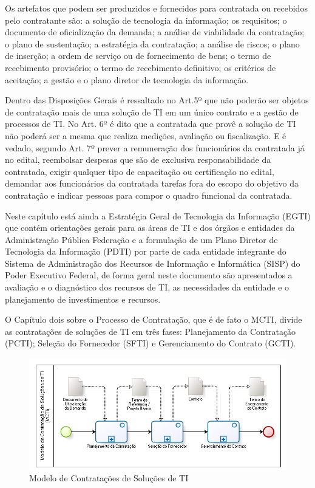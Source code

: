 Os artefatos que podem ser produzidos e fornecidos para contratada ou recebidos pelo contratante são: a solução de tecnologia da informação; os requisitos; o documento de oficialização da demanda; a análise de viabilidade da contratação; o plano de sustentação; a estratégia da contratação; a análise de riscos; o plano de inserção; a ordem de serviço ou de fornecimento de bens; o termo de recebimento provisório; o termo de recebimento definitivo; os critérios de aceitação; a gestão e o plano diretor de tecnologia da informação.

Dentro das Disposições Gerais é ressaltado no Art.5º que não poderão ser objetos de contratação mais de uma solução de TI em um único contrato e a gestão de processos de TI.  No Art. 6º é dito que a contratada que provê a solução de TI não poderá ser a mesma que realiza medições, avaliação ou fiscalização. E é vedado, segundo Art. 7º prever a remuneração dos funcionários da contratada já no edital, reembolsar despesas que são de exclusiva responsabilidade da contratada, exigir qualquer tipo de capacitação ou certificação no edital, demandar aos funcionários da contratada tarefas fora do escopo do objetivo da contratação  e indicar pessoas para compor o quadro funcional da contratada. 

Neste capítulo está ainda a Estratégia Geral de Tecnologia da Informação (EGTI) que contém orientações gerais para as áreas de TI e dos órgãos e entidades da Administração Pública Federação e a formulação de um Plano Diretor de Tecnologia da Informação (PDTI) por parte de cada entidade integrante do Sistema de Administração dos Recursos de Informação e Informática (SISP) do Poder Executivo Federal, de forma geral neste documento são apresentados a avaliação e o diagnóstico dos recursos de TI, as necessidades da entidade e o planejamento de investimentos e recursos.

O Capítulo dois sobre o Processo de Contratação, que é de fato o MCTI, divide as contratações de soluções de TI em três fases: Planejamento da Contratação (PCTI); Seleção do Fornecedor (SFTI) e Gerenciamento do Contrato (GCTI).

\begin{figure}[h]
		\centering
		\label{fig05}
			\includegraphics[scale=0.8]{figuras/MCTI.png}
		\caption{Modelo de Contratações de Soluções de TI}
\end{figure}


